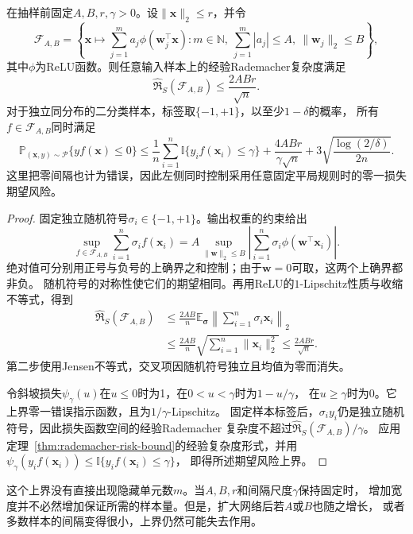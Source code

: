 \begin{theorem}[两层网络的范数与期望风险]
\label{thm:two-layer-norm-risk}
在抽样前固定$A,B,r,\gamma>0$。设$\|\bm x\|_2\leq r$，并令
\[
 \mathcal F_{A,B}=\left\{\bm x\mapsto\sum_{j=1}^m a_j\phi(\bm w_j^\top\bm x):
 m\in\mathbb N,\ \sum_{j=1}^m|a_j|\leq A,\ \|\bm w_j\|_2\leq B\right\},
\]
其中$\phi$为ReLU函数。则任意输入样本上的经验Rademacher复杂度满足
\[
 \widehat{\mathfrak R}_S(\mathcal F_{A,B})\leq\frac{2ABr}{\sqrt n}.
\]
对于独立同分布的二分类样本，标签取$\{-1,+1\}$，以至少$1-\delta$的概率，
所有$f\in\mathcal F_{A,B}$同时满足
\begin{equation}
 \mathbb P_{(\bm x,y)\sim\mathcal P}\{yf(\bm x)\leq0\}
 \leq\frac1n\sum_{i=1}^n\mathbb I\{y_i f(\bm x_i)\leq\gamma\}
 +\frac{4ABr}{\gamma\sqrt n}
 +3\sqrt{\frac{\log(2/\delta)}{2n}}.
 \label{eq:two-layer-margin-bound}
\end{equation}
这里把零间隔也计为错误，因此左侧同时控制采用任意固定平局规则时的零一损失期望风险。
\end{theorem}
\begin{proof}
固定独立随机符号$\sigma_i\in\{-1,+1\}$。输出权重的约束给出
\[
 \sup_{f\in\mathcal F_{A,B}}\sum_{i=1}^n\sigma_i f(\bm x_i)
 =A\sup_{\|\bm w\|_2\leq B}
 \left|\sum_{i=1}^n\sigma_i\phi(\bm w^\top\bm x_i)\right|.
\]
绝对值可分别用正号与负号的上确界之和控制；由于$\bm w=0$可取，这两个上确界都非负。
随机符号的对称性使它们的期望相同。再用ReLU的$1$-Lipschitz性质与收缩不等式，得到
\[
 \begin{aligned}
 \widehat{\mathfrak R}_S(\mathcal F_{A,B})
 &\leq\frac{2AB}{n}\mathbb E_{\bm\sigma}
       \left\|\sum_{i=1}^n\sigma_i\bm x_i\right\|_2\\
 &\leq\frac{2AB}{n}\sqrt{\sum_{i=1}^n\|\bm x_i\|_2^2}
 \leq\frac{2ABr}{\sqrt n}.
 \end{aligned}
\]
第二步使用Jensen不等式，交叉项因随机符号独立且均值为零而消失。

令斜坡损失$\psi_\gamma(u)$在$u\leq0$时为1，在$0<u<\gamma$时为$1-u/\gamma$，
在$u\geq\gamma$时为0。它上界零一错误指示函数，且为$1/\gamma$-Lipschitz。
固定样本标签后，$\sigma_i y_i$仍是独立随机符号，因此损失函数空间的经验Rademacher
复杂度不超过$\widehat{\mathfrak R}_S(\mathcal F_{A,B})/\gamma$。
应用定理~\ref{thm:rademacher-risk-bound}的经验复杂度形式，并用
$\psi_\gamma(y_i f(\bm x_i))\leq\mathbb I\{y_i f(\bm x_i)\leq\gamma\}$，
即得所述期望风险上界。
\end{proof}

这个上界没有直接出现隐藏单元数$m$。当$A,B,r$和间隔尺度$\gamma$保持固定时，
增加宽度并不必然增加保证所需的样本量。但是，扩大网络后若$A$或$B$也随之增长，
或者多数样本的间隔变得很小，上界仍然可能失去作用。

